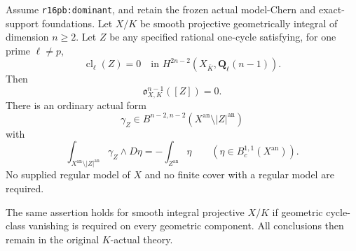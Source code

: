 \begin{theorem}
\label{r16G:one-cycles}
Assume \texttt{r16pb:dominant}, and retain the frozen
actual model-Chern and exact-support foundations.  Let
$X/K$ be smooth projective geometrically integral of
dimension $n\geq2$.  Let $Z$ be any specified rational
one-cycle satisfying, for one prime $\ell\ne p$,
\[
 \operatorname{cl}_\ell(Z)=0
     \quad\text{in }H^{2n-2}(X_{\bar K},\mathbf Q_\ell(n-1)).
\tag{GC16.4}\label{r16G:curve-homology}
\]
Then
\[
                       \mathfrak o_{X,K}^{n-1}([Z])=0.
\tag{GC16.5}\label{r16G:curve-obstruction}
\]
There is an ordinary actual form
\[
 \gamma_Z\in B^{n-2,n-2}
      (X^{\mathrm{an}}\setminus |Z|^{\mathrm{an}})
\]
with
\[
 \int_{X^{\mathrm{an}}\setminus |Z|^{\mathrm{an}}}
                \gamma_Z\wedge D\eta
             =-\int_{Z^{\mathrm{an}}}\eta
       \qquad(\eta\in B_c^{1,1}(X^{\mathrm{an}})).
\tag{GC16.6}\label{r16G:curve-G}
\]
No supplied regular model of $X$ and no finite cover with
a regular model are required.

The same assertion holds for smooth integral projective
$X/K$ if geometric cycle-class vanishing is required on
every geometric component.  All conclusions then remain
in the original $K$-actual theory.
\end{theorem}

